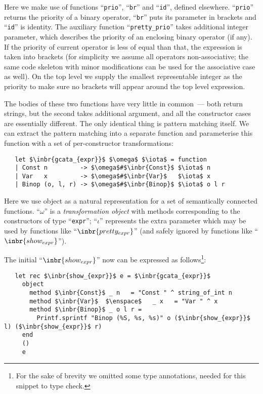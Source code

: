 Here we make use of functions ``\lstinline{prio}'', ``\lstinline{br}'' and ``\lstinline{id}'', defined elsewhere. ``\lstinline{prio}''
returns the priority of a binary operator, ``\lstinline{br}'' puts its parameter in brackets and ``\lstinline{id}''
is identity. The auxiliary function ``\lstinline{pretty_prio}'' takes additional integer parameter, which describes the priority of an enclosing
binary operator (if any). If the priority of current operator is less of equal than that, the expression is taken into brackets (for simplicity we assume all
operators non-associative; the same code skeleton with minor modifications can be used for the associative case as well). On the top level we supply the
smallest representable integer as the priority to make sure no brackets will appear around the top level expression.

The bodies of these two functions have very little in common~--- both return strings, but the second takes additional argument, and all the constructor cases
are essentially different. The only identical thing is pattern matching itself. We can extract the pattern matching into a separate function and parameterise this
function with a set of per-constructor transformations:

\begin{lstlisting}
   let $\inbr{gcata_{expr}}$ $\omega$ $\iota$ = function
   | Const n         -> $\omega$#$\inbr{Const}$ $\iota$ n
   | Var   x         -> $\omega$#$\inbr{Var}$   $\iota$ x
   | Binop (o, l, r) -> $\omega$#$\inbr{Binop}$ $\iota$ o l r
\end{lstlisting}

Here we use object as a natural representation for a set of semantically connected functions. ``$\omega$'' is a \emph{transformation object} with methods corresponding to
the constructors of type ``\lstinline{expr}''; ``$\iota$'' represents the extra parameter which may be used by functions like ``$\inbr{pretty_{expr}}$'' (and safely
ignored by functions like ``$\inbr{show_{expr}}$'').

The initial ``$\inbr{show_{expr}}$'' now can be expressed as follows\footnote{For the sake of brevity we omitted some type annotations, needed for this snippet to type check.}:

\begin{lstlisting}
   let rec $\inbr{show_{expr}}$ e = $\inbr{gcata_{expr}}$
     object
       method $\inbr{Const}$ _ n   = "Const " ^ string_of_int n
       method $\inbr{Var}$  $\enspace$   _ x   = "Var " ^ x
       method $\inbr{Binop}$ _ o l r =
         Printf.sprintf "Binop (%S, %s, %s)" o ($\inbr{show_{expr}}$ l) ($\inbr{show_{expr}}$ r)
     end
     ()
     e
\end{lstlisting}


